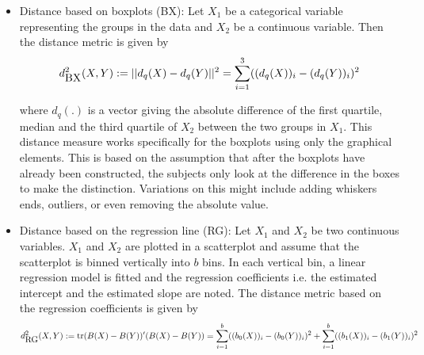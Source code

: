 \documentclass[12]{article}
\newcommand{\blue}[1]{{\color{blue} #1}}
\begin{document}
\begin{itemize}



\item Distance based on boxplots (BX): Let $X_1$ be a categorical variable representing the groups in the data and $X_2$ be a continuous variable. Then the distance metric is given by
 \[
d^2_{\hbox{BX}}(X, Y) := || d_q(X) - d_q(Y)||^2 = \sum_{i=1}^3 ((d_q(X))_i - (d_q(Y))_i)^2
\]

where $d_q(.)$ is a vector giving the absolute difference of the first quartile, median and the third quartile of $X_2$ between the two groups in $X_1$. This distance measure works specifically for the boxplots using only the graphical elements. This is based on the assumption that after the boxplots have already been constructed, the subjects only look at the difference in the boxes to make the distinction. Variations on this might include adding whiskers ends, outliers, or even removing the absolute value. 

\item Distance based on the regression line (RG): Let $X_1$ and $X_2$ be two continuous variables. $X_1$ and $X_2$ are plotted in a scatterplot and assume that the scatterplot is binned vertically into $b$ bins. In each vertical bin, a linear regression model is fitted and the regression coefficients i.e. the estimated intercept and the estimated slope are noted. The distance metric based on the regression coefficients is given by
 \[
d^2_{\hbox{RG}}(X, Y) := \hbox{tr} (B(X) - B(Y))' (B(X) - B(Y)) = \sum_{i=1}^b ((b_0(X))_i - (b_0(Y))_i)^2 + \sum_{i=1}^b ((b_1(X))_i - (b_1(Y))_i)^2
\]


\end{itemize}
\end{document}

